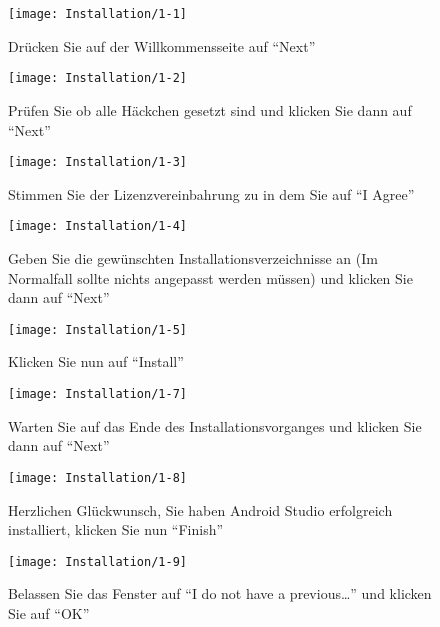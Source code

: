 \begin{figure}
  \centering
  \begin{minipage}[b]{0.48\textwidth}
    \texttt{[image: Installation/1-1]}
    \caption{Drücken Sie auf der Willkommensseite auf ``Next''}
  \end{minipage}
  \hfill
  \begin{minipage}[b]{0.48\textwidth}
    \texttt{[image: Installation/1-2]}
    \caption{Prüfen Sie ob alle Häckchen gesetzt sind und klicken Sie dann auf ``Next''}
  \end{minipage}
\end{figure}

\begin{figure}
  \centering
  \begin{minipage}[b]{0.48\textwidth}
    \texttt{[image: Installation/1-3]}
    \caption{Stimmen Sie der Lizenzvereinbahrung zu in dem Sie auf ``I Agree''}
  \end{minipage}
  \hfill
  \begin{minipage}[b]{0.48\textwidth}
    \texttt{[image: Installation/1-4]}
    \caption{Geben Sie die gewünschten Installationsverzeichnisse an (Im Normalfall sollte nichts angepasst werden müssen) und klicken Sie dann auf ``Next''}
  \end{minipage}
\end{figure}

\begin{figure}
  \centering
  \begin{minipage}[b]{0.48\textwidth}
    \texttt{[image: Installation/1-5]}
    \caption{Klicken Sie nun auf ``Install''}
  \end{minipage}
  \hfill
  \begin{minipage}[b]{0.48\textwidth}
    \texttt{[image: Installation/1-7]}
    \caption{Warten Sie auf das Ende des Installationsvorganges und klicken Sie dann auf ``Next''}
  \end{minipage}
\end{figure}

\begin{figure}
  \centering
  \begin{minipage}[b]{0.48\textwidth}
    \texttt{[image: Installation/1-8]}
    \caption{Herzlichen Glückwunsch, Sie haben Android Studio erfolgreich installiert, klicken Sie nun ``Finish''}
  \end{minipage}
  \hfill
  \begin{minipage}[b]{0.48\textwidth}
    \texttt{[image: Installation/1-9]}
    \caption{Belassen Sie das Fenster auf ``I do not have a previous\ldots'' und klicken Sie auf ``OK''}
  \end{minipage}
\end{figure}

